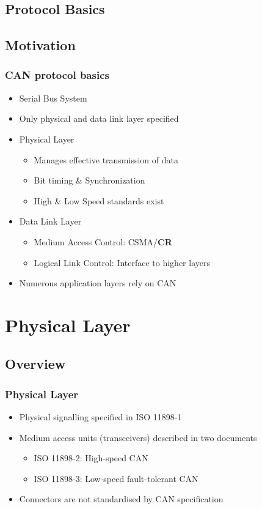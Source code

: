 \documentclass{beamer}
\begin{document}
\subsection{Protocol Basics}
\subsection{Motivation}
\begin{frame}
\frametitle{CAN protocol basics}
\begin{itemize}
	\item Serial Bus System
	\item Only physical and data link layer specified
	\item Physical Layer
	\begin{itemize}
		\item Manages effective transmission of data
		\item Bit timing \& Synchronization
		\item High \& Low Speed standards exist
	\end{itemize}
	\item Data Link Layer
	\begin{itemize}
		\item Medium Access Control: CSMA/\textbf{CR}
		\item Logical Link Control: Interface to higher layers
	\end{itemize}
	\item Numerous application layers rely on CAN
\end{itemize}

\end{frame}

\section{Physical Layer}
\subsection{Overview}

\begin{frame}
  \frametitle{Physical Layer}
	\begin{itemize}
		\item Physical signalling specified in ISO 11898-1
		\item Medium access units (transceivers) described in two documents
		\begin{itemize}
			\item ISO 11898-2: High-speed CAN
			\item ISO 11898-3: Low-speed fault-tolerant CAN
		\end{itemize}
		\item Connectors are not standardised by CAN specification
	\end{itemize}
\end{frame}
\end{document}
